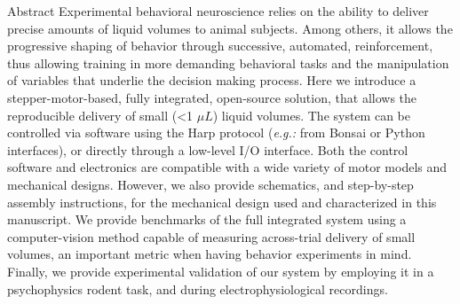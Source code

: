 {\large Abstract}
\newline
\textnormal{Experimental behavioral neuroscience relies on the ability to deliver precise amounts of liquid volumes to animal subjects. Among others, it allows the progressive shaping of behavior through successive, automated, reinforcement, thus allowing training in more demanding behavioral tasks and the manipulation of variables that underlie the decision making process.
Here we introduce a stepper-motor-based, fully integrated, open-source solution, that allows the reproducible delivery of small (<1 $\mu L$) liquid volumes.
The system can be controlled via software using the Harp protocol (\textit{e.g.:} from Bonsai or Python interfaces), or directly through a low-level I/O interface. Both the control software and electronics are compatible with a wide variety of motor models and mechanical designs. However, we also provide schematics, and step-by-step assembly instructions, for the mechanical design used and characterized in this manuscript.
We provide benchmarks of the full integrated system using a computer-vision method capable of measuring across-trial delivery of small volumes, an important metric when having behavior experiments in mind. Finally, we provide experimental validation of our system by employing it in a psychophysics rodent task, and during electrophysiological recordings.}

